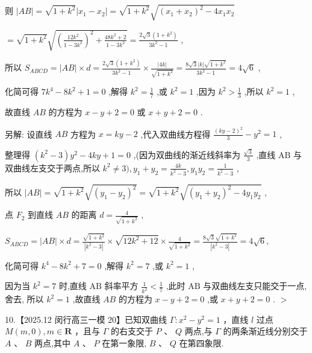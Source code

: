 \documentclass[10pt]{article}
\begin{document}
则 \(\left| {AB}\right|  = \sqrt{1 + {k}^{2}}\left| {{x}_{1} - {x}_{2}}\right|  = \sqrt{1 + {k}^{2}}\sqrt{{\left( {x}_{1} + {x}_{2}\right) }^{2} - 4{x}_{1}{x}_{2}}\)

\(= \sqrt{1 + {k}^{2}}\sqrt{{\left( \frac{{12}{k}^{2}}{1 - 3{k}^{2}}\right) }^{2} + \frac{{48}{k}^{2} + 2}{1 - 3{k}^{2}}} = \frac{2\sqrt{3}\left( {1 + {k}^{2}}\right) }{3{k}^{2} - 1}\) ,

所以 \({S}_{ABCD} = \left| {AB}\right|  \times  d = \frac{2\sqrt{3}\left( {1 + {k}^{2}}\right) }{3{k}^{2} - 1} \times  \frac{\left| 4k\right| }{\sqrt{1 + {k}^{2}}} = \frac{8\sqrt{3}\left| k\right| \sqrt{1 + {k}^{2}}}{3{k}^{2} - 1} = 4\sqrt{6}\) ,

化简可得 \(7{k}^{4} - 8{k}^{2} + 1 = 0\) ,解得 \({k}^{2} = \frac{1}{7}\) ,或 \({k}^{2} = 1\) ,因为 \({k}^{2} > \frac{1}{3}\) ,所以 \({k}^{2} = 1\) ,

故直线 \({AB}\) 的方程为 \(x - y + 2 = 0\) 或 \(x + y + 2 = 0\) .

另解: 设直线 \({AB}\) 方程为 \(x = {ky} - 2\) ,代入双曲线方程得 \(\frac{{\left( ky - 2\right) }^{2}}{3} - {y}^{2} = 1\) ,

整理得 \(\left( {{k}^{2} - 3}\right) {y}^{2} - {4ky} + 1 = 0\) ,(因为双曲线的渐近线斜率为 \(\frac{\sqrt{3}}{3}\) ,直线 \(\mathrm{{AB}}\) 与双曲线左支交于两点,所以 \({k}^{2} \neq  3),{y}_{1} + {y}_{2} = \frac{4k}{{k}^{2} - 3},{y}_{1}{y}_{2} = \frac{1}{{k}^{2} - 3}\) ,

所以 \(\left| {AB}\right|  = \sqrt{1 + {k}^{2}}\sqrt{{\left( {y}_{1} - {y}_{2}\right) }^{2}} = \sqrt{1 + {k}^{2}}\sqrt{{\left( {y}_{1} + {y}_{2}\right) }^{2} - 4{y}_{1}{y}_{2}}\) ,

点 \({F}_{2}\) 到直线 \({AB}\) 的距离 \(d = \frac{4}{\sqrt{1 + {k}^{2}}}\) ,

\({S}_{ABCD} = \left| {AB}\right|  \times  d = \frac{\sqrt{1 + {k}^{2}}}{\left| {k}^{2} - 3\right| } \times  \sqrt{{12}{k}^{2} + {12}} \times  \frac{4}{\sqrt{1 + {k}^{2}}} = \frac{8\sqrt{3}\sqrt{1 + {k}^{2}}}{\left| {k}^{2} - 3\right| } = 4\sqrt{6},\)

化简可得 \({k}^{4} - 8{k}^{2} + 7 = 0\) ,解得 \({k}^{2} = 7\) ,或 \({k}^{2} = 1\) ,

因为当 \({k}^{2} = 7\) 时,直线 \(\mathrm{{AB}}\) 斜率平方 \(\frac{1}{{k}^{2}} < \frac{1}{7}\) ,此时 \(\mathrm{{AB}}\) 与双曲线左支只能交于一点,舍去, 所以 \({k}^{2} = 1\) ,故直线 \({AB}\) 的方程为 \(x - y + 2 = 0\) ,或 \(x + y + 2 = 0\) . \(>\)

10.【2025.12 闵行高三一模 20】已知双曲线 \(\Gamma  : {x}^{2} - {y}^{2} = 1\) ，直线 \(l\) 过点 \(M\left( {m,0}\right) ,m \in  \mathbf{R}\) ，且与 \(\Gamma\) 的右支交于 \(P\text{ 、 }Q\) 两点,与 \(\Gamma\) 的两条渐近线分别交于 \(A\text{ 、 }B\) 两点,其中 \(A\text{ 、 }P\) 在第一象限, \(B\text{ 、 }Q\) 在第四象限.
\end{document}
